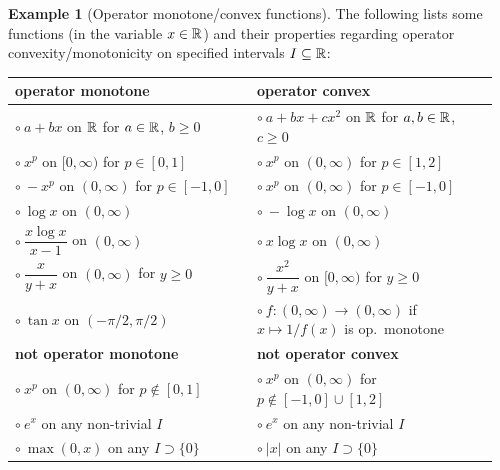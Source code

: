 \documentclass[11pt,a4paper]{article}
\theoremstyle{plain}
\theoremstyle{definition}
\newtheorem{example}{Example}[section]
\theoremstyle{remark}
\numberwithin{equation}{section}
\begin{document}
\begin{example}[Operator monotone/convex functions]
    The following lists some functions (in the variable $x\in \mathbb{R}$) and their properties
    regarding operator convexity/monotonicity on specified intervals $I\subseteq \mathbb{R}$:
    \begin{center}
        \renewcommand{\arraystretch}{1.2}
        \begin{tabular}{|p{0.48\linewidth}|p{0.48\linewidth}|}
            \hline
            \textbf{operator monotone}                           & \textbf{operator convex}     \\
            \hline
            $\circ\ a+bx$ on $\mathbb{R}$ for $a\in \mathbb{R}$, $b\ge 0$      &
            $\circ\ a+bx+cx^2$ on $\mathbb{R}$ for $a,b\in \mathbb{R}$, $c\ge 0$                              \\
            $\circ\ x^p$ on $[0,\infty)$ for $p\in[0,1]$         &
            $\circ\ x^p$ on $(0,\infty)$ for $p\in[1,2]$                                        \\
            $\circ\ -x^p$ on $(0,\infty)$ for $p\in[-1,0]$       &
            $\circ\ x^p$ on $(0,\infty)$ for $p\in[-1,0]$                                       \\
            $\circ\ \log x$ on $(0,\infty)$                      &
            $\circ\ -\log x$ on $(0,\infty)$                                                    \\
            $\circ\ \dfrac{x\log x}{x-1}$ on $(0,\infty)$        &
            $\circ\ x\log x$ on $(0,\infty)$                                                    \\
            $\circ\ \dfrac{x}{y+x}$ on $(0,\infty)$ for $y\ge 0$ &
            $\circ\ \dfrac{x^2}{y+x}$ on $[0,\infty)$ for $y\ge 0$                              \\
            $\circ\ \tan x$ on $(-\pi/2,\pi/2)$                  &
            $\circ\ f:(0,\infty)\to(0,\infty)$ if $x\mapsto 1/f(x)$ is op.\ monotone            \\
            \hline
            \textbf{not operator monotone}                       & \textbf{not operator convex} \\
            \hline
            $\circ\ x^p$ on $(0,\infty)$ for $p\notin[0,1]$      &
            $\circ\ x^p$ on $(0,\infty)$ for $p\notin[-1,0]\cup[1,2]$                           \\
            $\circ\ e^x$ on any non-trivial $I$                  &
            $\circ\ e^x$ on any non-trivial $I$                                                 \\
            $\circ\ \max(0,x)$ on any $I\supset\{0\}$            &
            $\circ\ |x|$ on any $I\supset\{0\}$                                                 \\
            \hline
        \end{tabular}
    \end{center}


\end{example}
\end{document}
